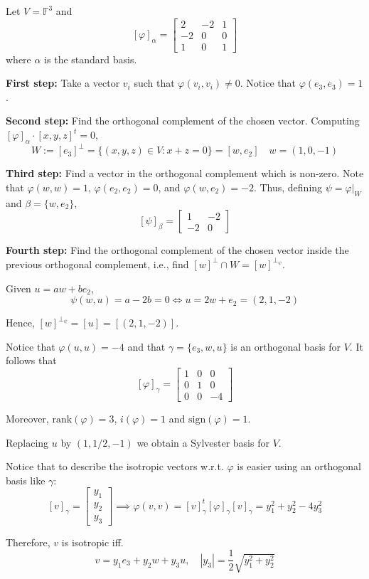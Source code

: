 \begin{example}\label{ex:202301030826}
  Let $V = \mathbb{F}^3$ and \[ [\varphi]_\alpha = \begin{bmatrix}
    2  & -2 & 1 \\
    -2 & 0  & 0 \\
    1  & 0  & 1 
  \end{bmatrix} \] 
  where $\alpha$ is the standard basis. 

  \textbf{First step:} Take a vector $v_i$ such that $\varphi(v_i, v_i) \neq 0$. Notice that $\varphi(e_3, e_3) = 1$. 

  \textbf{Second step:} Find the orthogonal complement of the chosen vector. Computing $[\varphi]_\alpha \cdot [x,y,z]^t = 0$,
  \[
    W := [e_3]^\perp = \{ (x,y,z) \in V : x+z = 0 \} = [w, e_2] \quad w = (1, 0, -1)
  \]

  \textbf{Third step:} Find a vector in the orthogonal complement which is non-zero. Note that $\varphi(w,w) = 1$, $\varphi(e_2, e_2) = 0$, and $\varphi(w, e_2) = -2$. Thus, defining $\psi = \varphi|_W$ and $\beta = \{ w, e_2 \}$, 
  \[
    [\psi]_\beta = \begin{bmatrix}
      1  & -2 \\
      -2 & 0
    \end{bmatrix}
  \]

  \textbf{Fourth step:} Find the orthogonal complement of the chosen vector inside the previous orthogonal complement, i.e., find $[w]^\perp \cap W = [w]^{\perp_\psi}$. 

  Given $u = aw + be_2$, 
  \[
    \psi(w,u) = a - 2b = 0 \iff u = 2w + e_2 = (2, 1, -2)
  \]
  
  Hence, $[w]^{\perp_\psi} = [u] = [(2, 1, -2)]$.

  Notice that $\varphi(u,u) = -4$ and that $\gamma = \{ e_3, w, u \}$ is an orthogonal basis for $V$. It follows that 
  \[
    [\varphi]_\gamma = \begin{bmatrix}
      1 & 0 & 0 \\
      0 & 1 & 0 \\
      0 & 0 & -4
    \end{bmatrix}
  \]

  Moreover, $\text{rank}(\varphi) = 3$, $i(\varphi) = 1$ and $\text{sign}(\varphi) = 1$. 

  Replacing $u$ by $(1, 1/2, -1)$ we obtain a Sylvester basis for $V$.

  Notice that to describe the isotropic vectors w.r.t. $\varphi$ is easier using an orthogonal basis like $\gamma$: 
  \[
    [v]_\gamma = \begin{bmatrix}
      y_1 \\
      y_2 \\
      y_3 
    \end{bmatrix}
    \implies \varphi(v,v) = [v]_\gamma^t [\varphi]_\gamma [v]_\gamma = y_1^2 + y_2^2 - 4y_3^2
  \]

  Therefore, $v$ is isotropic iff. 
  \[
    v = y_1 e_3 + y_2 w + y_3 u, \quad |y_3| = \frac{1}{2} \sqrt{y_1^2 + y_2^2}
  \]
\end{example}

